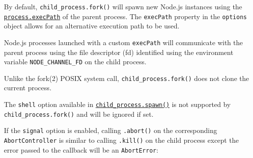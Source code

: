 By default, \texttt{child\_process.fork()} will spawn new Node.js
instances using the
\href{process.md\#processexecpath}{\texttt{process.execPath}} of the
parent process. The \texttt{execPath} property in the \texttt{options}
object allows for an alternative execution path to be used.

Node.js processes launched with a custom \texttt{execPath} will
communicate with the parent process using the file descriptor (fd)
identified using the environment variable \texttt{NODE\_CHANNEL\_FD} on
the child process.

Unlike the fork(2) POSIX system call, \texttt{child\_process.fork()}
does not clone the current process.

The \texttt{shell} option available in
\hyperref[child_processspawncommand-args-options]{\texttt{child\_process.spawn()}}
is not supported by \texttt{child\_process.fork()} and will be ignored
if set.

If the \texttt{signal} option is enabled, calling \texttt{.abort()} on
the corresponding \texttt{AbortController} is similar to calling
\texttt{.kill()} on the child process except the error passed to the
callback will be an \texttt{AbortError}:

